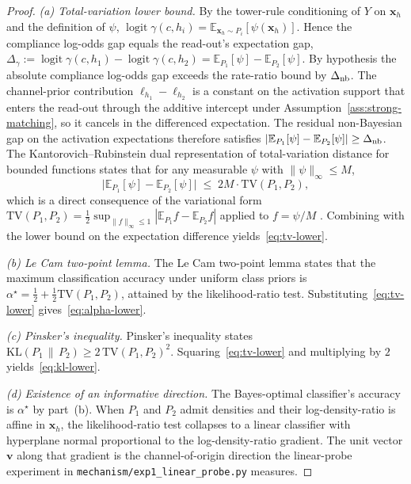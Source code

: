 \documentclass[11pt]{article}
\theoremstyle{definition}
\theoremstyle{remark}
\begin{document}
\begin{proof}
\emph{(a) Total-variation lower bound.} By the tower-rule conditioning of $Y$ on
$\mathbf{x}_h$ and the definition of $\psi$,
$\operatorname{logit} \gamma(c, h_i) = \mathbb{E}_{\mathbf{x}_h \sim P_i}[\psi(\mathbf{x}_h)]$.
Hence the compliance log-odds gap equals the read-out's expectation gap,
$\Delta_\gamma := \operatorname{logit} \gamma(c, h_1) - \operatorname{logit} \gamma(c, h_2)
= \mathbb{E}_{P_1}[\psi] - \mathbb{E}_{P_2}[\psi]$.
By hypothesis the absolute compliance log-odds gap exceeds the rate-ratio bound by
$\Delta_{\textnormal{nb}}$. The channel-prior contribution
$\ell_{h_1} - \ell_{h_2}$ is a constant on the activation support that enters the
read-out through the additive intercept under Assumption~\ref{ass:strong-matching},
so it cancels in the differenced expectation. The residual non-Bayesian gap on
the activation expectations therefore satisfies
$|\mathbb{E}_{P_1}[\psi] - \mathbb{E}_{P_2}[\psi]| \ge \Delta_{\textnormal{nb}}$.
The Kantorovich--Rubinstein dual representation of total-variation distance for
bounded functions states that for any measurable $\psi$ with $\|\psi\|_\infty \le M$,
\begin{equation}
\label{eq:kr-bound}
\bigl|\mathbb{E}_{P_1}[\psi] - \mathbb{E}_{P_2}[\psi]\bigr|
\;\le\; 2 M \cdot \mathrm{TV}(P_1, P_2),
\end{equation}
which is a direct consequence of the variational form
$\mathrm{TV}(P_1, P_2) = \tfrac{1}{2} \sup_{\|f\|_\infty \le 1} |\mathbb{E}_{P_1} f - \mathbb{E}_{P_2} f|$
applied to $f = \psi/M$ \cite{coverthomas2006elements}. Combining with the lower bound
on the expectation difference yields~\eqref{eq:tv-lower}.

\emph{(b) Le Cam two-point lemma.} The Le Cam two-point lemma
\cite[\S2.4]{tsybakov2009nonparametric} states that the maximum classification
accuracy under uniform class priors is
$\alpha^\star = \tfrac{1}{2} + \tfrac{1}{2}\mathrm{TV}(P_1, P_2)$,
attained by the likelihood-ratio test. Substituting~\eqref{eq:tv-lower}
gives~\eqref{eq:alpha-lower}.

\emph{(c) Pinsker's inequality.} Pinsker's inequality
\cite[Theorem~17.3.3]{coverthomas2006elements} states
$\mathrm{KL}(P_1 \,\|\, P_2) \ge 2 \, \mathrm{TV}(P_1, P_2)^{2}$.
Squaring~\eqref{eq:tv-lower} and multiplying by $2$ yields~\eqref{eq:kl-lower}.

\emph{(d) Existence of an informative direction.} The Bayes-optimal classifier's
accuracy is $\alpha^\star$ by part~(b). When $P_1$ and $P_2$ admit densities and
their log-density-ratio is affine in $\mathbf{x}_h$, the likelihood-ratio test
collapses to a linear classifier with hyperplane normal proportional to the
log-density-ratio gradient. The unit vector $\mathbf{v}$ along that gradient is the
channel-of-origin direction the linear-probe experiment in
\texttt{mechanism/exp1\_linear\_probe.py} measures.
\qedhere
\end{proof}
\end{document}
